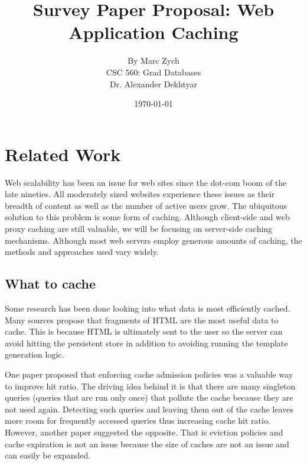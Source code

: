 \documentclass[12pt]{article}
\begin{document}
\title{\vfill Survey Paper Proposal: Web Application Caching}

\author{
By Marc Zych \vspace{10pt} \\
CSC 560: Grad Databases \vspace{10pt} \\
Dr. Alexander Dekhtyar \vspace{10pt} \\
}
\date{\today}

\maketitle


\thispagestyle{empty}
\newpage



\section{Related Work}
Web scalability has been an issue for web sites since the dot-com boom of the late nineties.
All moderately sized websites experience these issues as their breadth of content as well as the number of active users grow.
The ubiquitous solution to this problem is some form of caching.
Although client-side and web proxy caching are still valuable, we will be focusing on server-side caching mechanisms.
Although most web servers employ generous amounts of caching, the methods and approaches used vary widely.

\subsection{What to cache}
Some research has been done looking into what data is most efficiently cached.
Many sources propose that fragments of HTML are the most useful data to cache. \cite{comparisonOfCachingSolutions}
This is because HTML is ultimately sent to the user so the server can avoid hitting the persistent store in addition to avoiding running the template generation logic. \cite{howBasecampGotSoFast}

One paper proposed that enforcing cache admission policies was a valuable way to improve hit ratio. \cite{cacheAdmissionPolicies}
The driving idea behind it is that there are many singleton queries (queries that are run only once) that pollute the cache because they are not used again.
Detecting such queries and leaving them out of the cache leaves more room for frequently accessed queries thus increasing cache hit ratio.
However, another paper suggested the opposite.
That is eviction policies and cache expiration is not an issue because the size of caches are not an issue and can easily be expanded. \cite{refreshingPerspectiveSearch}
\end{document}
